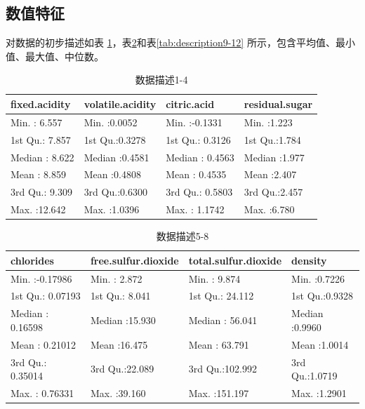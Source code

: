 \documentclass[fontset=ubuntu]{ctexart}
\begin{document}
        \subsection{数值特征}
        对数据的初步描述如表 \ref{tab:description1-4}，表\ref{tab:description5-8}和表\ref{tab:description9-12} 所示，包含平均值、最小值、最大值、中位数。
        \begin{table}[ht]
            \centering
            \caption{数据描述1-4}
            \vspace{5pt}
            \begin{tabular}{llll}
                \hline
                fixed.acidity & volatile.acidity &  citric.acid & residual.sugar \\ 
                \hline
                Min.   : 6.557   & Min.   :0.0052   & Min.   :-0.1331   & Min.   :1.223   \\ 
                1st Qu.: 7.857   & 1st Qu.:0.3278   & 1st Qu.: 0.3126   & 1st Qu.:1.784   \\ 
                Median : 8.622   & Median :0.4581   & Median : 0.4563   & Median :1.977   \\ 
                Mean   : 8.859   & Mean   :0.4808   & Mean   : 0.4535   & Mean   :2.407   \\ 
                3rd Qu.: 9.309   & 3rd Qu.:0.6300   & 3rd Qu.: 0.5803   & 3rd Qu.:2.457   \\ 
                Max.   :12.642   & Max.   :1.0396   & Max.   : 1.1742   & Max.   :6.780   \\ 
                \hline
            \end{tabular}
            \label{tab:description1-4}
        \end{table}

        \begin{table}[ht]
            \centering
            \caption{数据描述5-8}
            \vspace{5pt}
            \begin{tabular}{llll}
                \hline
                chlorides & free.sulfur.dioxide & total.sulfur.dioxide &    density \\ 
                \hline
                Min.   :-0.17986   & Min.   : 2.872   & Min.   :  9.874   & Min.   :0.7226   \\ 
                1st Qu.: 0.07193   & 1st Qu.: 8.041   & 1st Qu.: 24.112   & 1st Qu.:0.9328   \\ 
                Median : 0.16598   & Median :15.930   & Median : 56.041   & Median :0.9960   \\ 
                Mean   : 0.21012   & Mean   :16.475   & Mean   : 63.791   & Mean   :1.0014   \\ 
                3rd Qu.: 0.35014   & 3rd Qu.:22.089   & 3rd Qu.:102.992   & 3rd Qu.:1.0719   \\ 
                Max.   : 0.76331   & Max.   :39.160   & Max.   :151.197   & Max.   :1.2901   \\ 
                \hline
            \end{tabular}
            \label{tab:description5-8}
        \end{table}
\end{document}
